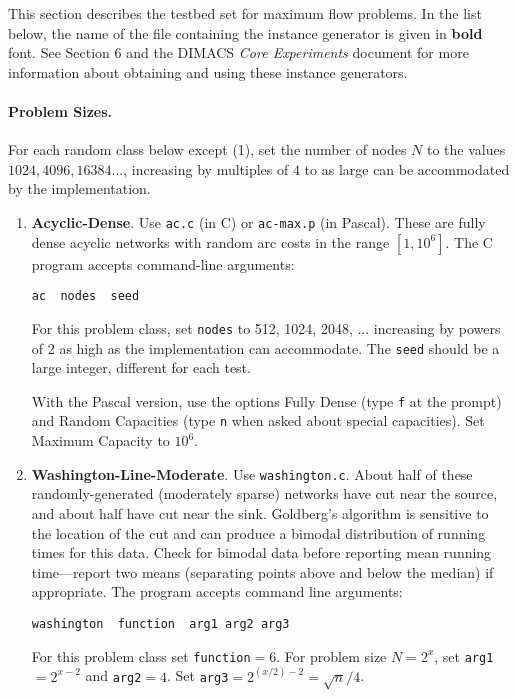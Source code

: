 This section describes the testbed set for maximum flow problems.  
In the list below, the name of the file containing the 
instance generator is given in {\bf bold } font.  See Section
6 and the DIMACS {\em Core Experiments} document for 
more information about obtaining and using these 
instance generators.  

\paragraph{Problem Sizes.}  For each random class below except (1), 
set the number of nodes $N$ to the values $1024, 4096, 16384 . . .$,
increasing by multiples of $4$ to as large can be accommodated 
by the implementation.   

\begin{enumerate} 
\item {\bf Acyclic-Dense}.  Use {\tt ac.c} (in C) or {\tt ac-max.p} 
(in Pascal). 
These are fully dense acyclic networks with random arc costs in the range
$[ 1, 10^6]$.   The C program accepts command-line arguments: 
\begin{verbatim}
ac  nodes  seed
\end{verbatim} 
For this problem class, set {\tt nodes} to 
512,  1024, 2048, ... increasing by powers of 2 as high as the 
implementation can accommodate.   The {\tt seed} should be a large
integer, different for each test.  

With the Pascal version, use the options Fully Dense (type {\tt f} at
the prompt) and Random Capacities (type {\tt n} when asked about 
special capacities).   Set Maximum Capacity to $10^6$. 

\item {\bf Washington-Line-Moderate}.  Use {\tt washington.c}. 
About half of these randomly-generated (moderately sparse) networks 
have cut near the source, and about half have cut near the sink.  
Goldberg's algorithm is sensitive to the location of the cut and
can produce a bimodal distribution of running times for this data.   
Check for bimodal data before reporting mean running time---report two 
means (separating points above and below the median) if appropriate.  
The program accepts command line arguments: 
\begin{verbatim} 
washington  function  arg1 arg2 arg3
\end{verbatim}
For this problem class set {\tt function}$=6$.  For problem size 
$N = 2^x$, set 
{\tt arg1}$= 2^{x-2}$ and {\tt arg2}$ = 4$.  Set 
{\tt arg3}$ = 2^{(x/2) -2} = \sqrt{n}/4$.


\end{enumerate}
